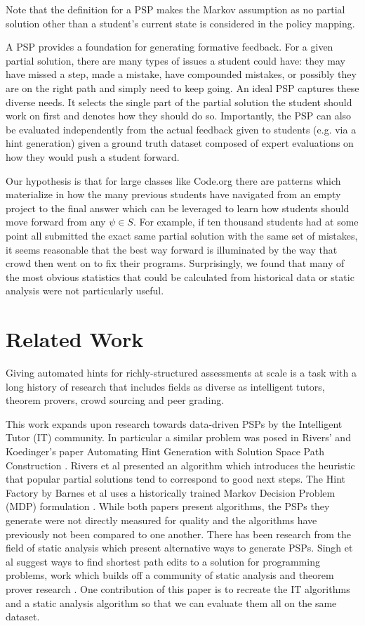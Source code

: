 Note that the definition for a PSP makes the Markov assumption as no partial solution other than a student's current state is considered in the policy mapping. 

A PSP provides a foundation for generating formative feedback. For a given partial solution, there are many types of issues a student could have: they may have missed a step, made a mistake, have compounded mistakes, or possibly they are on the right path and simply need to keep going. An ideal PSP captures these diverse needs. It selects the single part of the partial solution the student should work on first and denotes how they should do so. Importantly, the PSP can also be evaluated independently from the actual feedback given to students (e.g. via a hint generation) given a ground truth dataset composed of expert evaluations on how they would push a student forward. 

Our hypothesis is that for large classes like Code.org there are patterns which materialize in how the many previous students have navigated from an empty project to the final answer which can be leveraged to learn how students should move forward from any $\psi \in S$. For example, if ten thousand students had at some point all submitted the exact same partial solution with the same set of mistakes, it seems reasonable that the best way forward is illuminated by the way that crowd then went on to fix their programs. Surprisingly, we found that many of the most obvious statistics that could be calculated from historical data or static analysis were not particularly useful. 

\section{Related Work}

Giving automated hints for richly-structured assessments at scale is a task with a long history of research that includes fields as diverse as intelligent tutors, theorem provers, crowd sourcing and peer grading.

This work expands upon research towards data-driven PSPs by the Intelligent Tutor (IT) community. In particular a similar problem was posed in Rivers' and Koedinger's paper Automating Hint Generation with Solution Space Path Construction \cite{rivers2014automating}. Rivers et al presented an algorithm which introduces the heuristic that popular partial solutions tend to correspond to good next steps. The Hint Factory by Barnes et al uses a historically trained Markov Decision Problem (MDP) formulation \cite{barnes2008toward}. While both papers present algorithms, the PSPs they generate were not directly measured for quality and the algorithms have previously not been compared to one another. There has been research from the field of static analysis which present alternative ways to generate PSPs. Singh et al suggest ways to find shortest path edits to a solution for programming problems, work which builds off a community of static analysis and theorem prover research \cite{singh2013automated}  \cite{cheang2003automated}. One contribution of this paper is to recreate the IT algorithms and a static analysis algorithm so that we can evaluate them all on the same dataset. 

